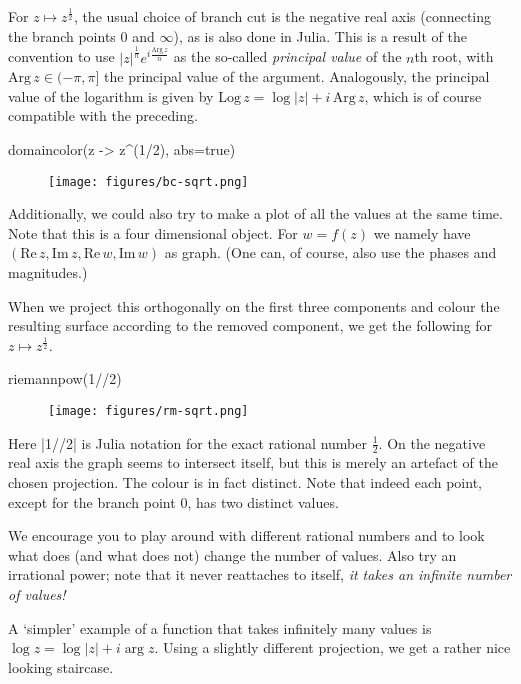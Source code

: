 \documentclass[a4paper]{article}
\begin{document}
For $z \mapsto z^\frac{1}{2}$, the usual choice of branch cut is the negative
real axis (connecting the branch points $0$ and $\infty$), as is also done in
Julia. This is a result of the convention to use
${|z|}^{\frac{1}{n}} e^{i \frac{\mathrm{Arg}\,z}{n}}$ as the so-called
\emph{principal value} of the $n$th root, with $\mathrm{Arg}\,z \in (-\pi, \pi]$
the principal value of the argument. Analogously, the principal value of the
logarithm is given by $\mathrm{Log}\,z = \log |z| + i\,\mathrm{Arg}\, z$, which
is of course compatible with the preceding.

\begin{juliaverbatim}
	domaincolor(z -> z^(1/2), abs=true)
\end{juliaverbatim}
\begin{figure}[H]
	\centering
	\texttt{[image: figures/bc-sqrt.png]}
\end{figure}

Additionally, we could also try to make a plot of all the values at the same
time. Note that this is a four dimensional object. For $w = f(z)$ we namely have
$(\mathrm{Re}\,z, \mathrm{Im}\,z, \mathrm{Re}\,w, \mathrm{Im}\,w)$ as
graph. (One can, of course, also use the phases and magnitudes.)

When we project this orthogonally on the first three components and colour
the resulting surface according to the removed component, we get the
following for $z \mapsto z^{\frac{1}{2}}$.

\begin{juliaverbatim}
	riemannpow(1//2)
\end{juliaverbatim}
\begin{figure}[H]
	\centering
	\texttt{[image: figures/rm-sqrt.png]}
\end{figure}

Here \jlv|1//2| is Julia notation for the exact rational number
$\frac{1}{2}$. On the negative real axis the graph seems to intersect itself,
but this is merely an artefact of the chosen projection. The colour is in fact
distinct. Note that indeed each point, except for the branch point $0$, has two
distinct values.

We encourage you to play around with different rational numbers and to look what
does (and what does not) change the number of values. Also try an irrational
power; note that it never reattaches to itself, \emph{it takes an infinite
	number of values!}

A `simpler' example of a function that takes infinitely many values is
$\log z = \log |z| + i\arg z$.  Using a slightly different projection, we
get a rather nice looking staircase.
\end{document}
